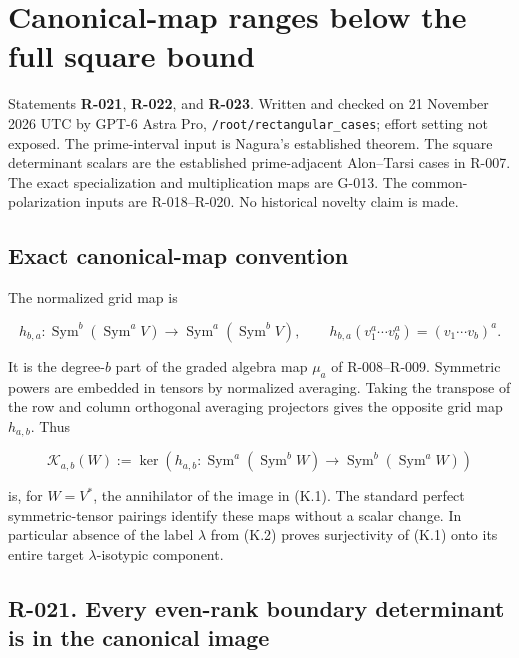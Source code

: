 \documentclass[
  10pt,
]{article}
\begin{document}
\section{Canonical-map ranges below the full square
bound}\label{canonical-map-ranges-below-the-full-square-bound}

Statements \textbf{R-021}, \textbf{R-022}, and \textbf{R-023}. Written
and checked on 21 November 2026 UTC by GPT-6 Astra Pro,
\texttt{\small /\allowbreak{}root/\allowbreak{}rectangular\_\allowbreak{}cases};
effort setting not exposed. The prime-interval input is Nagura's
established theorem. The square determinant scalars are the established
prime-adjacent Alon--Tarsi cases in R-007. The exact specialization and
multiplication maps are G-013. The common-polarization inputs are
R-018--R-020. No historical novelty claim is made.

\subsection{Exact canonical-map
convention}\label{exact-canonical-map-convention}

The normalized grid map is

\[
h_{b,a}:\operatorname{Sym}^{b}(\operatorname{Sym}^{a}V)
\longrightarrow\operatorname{Sym}^{a}(\operatorname{Sym}^{b}V),
\qquad
h_{b,a}(v_1^a\cdots v_b^a)=(v_1\cdots v_b)^a.
\tag{K.1}
\]

It is the degree-\(b\) part of the graded algebra map \(\mu_a\) of
R-008--R-009. Symmetric powers are embedded in tensors by normalized
averaging. Taking the transpose of the row and column orthogonal
averaging projectors gives the opposite grid map \(h_{a,b}\). Thus

\[
\mathcal K_{a,b}(W):=\ker\!\left(
h_{a,b}:\operatorname{Sym}^{a}(\operatorname{Sym}^{b}W)
\to\operatorname{Sym}^{b}(\operatorname{Sym}^{a}W)\right)
\tag{K.2}
\]

is, for \(W=V^*\), the annihilator of the image in (K.1). The standard
perfect symmetric-tensor pairings identify these maps without a scalar
change. In particular absence of the label \(\lambda\) from (K.2) proves
surjectivity of (K.1) onto its entire target \(\lambda\)-isotypic
component.

\subsection{R-021. Every even-rank boundary determinant is in the
canonical
image}\label{r-021.-every-even-rank-boundary-determinant-is-in-the-canonical-image}
\end{document}
